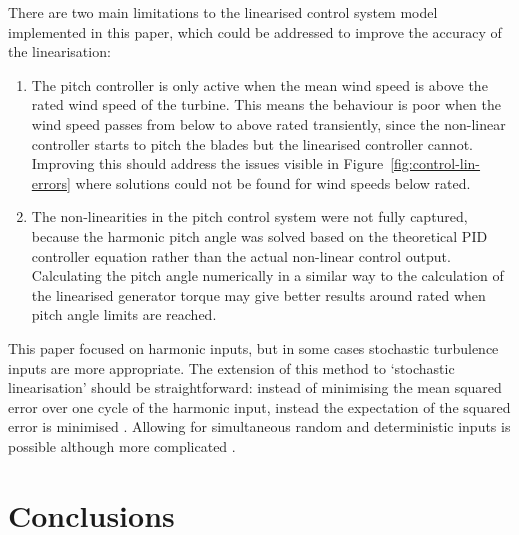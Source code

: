 \documentclass[a4paper,preprint]{elsarticle}
\begin{document}
There are two main limitations to the linearised control system model
implemented in this paper, which could be addressed to improve the accuracy of
the linearisation:
\begin{enumerate}
\item The pitch controller is only active when the mean wind speed is above the
  rated wind speed of the turbine. This means the behaviour is poor when the
  wind speed passes from below to above rated transiently, since the non-linear
  controller starts to pitch the blades but the linearised controller cannot.
  Improving this should address the issues visible in
  Figure~\ref{fig:control-lin-errors} where solutions could not be found for
  wind speeds below rated.
\item The non-linearities in the pitch control system were not fully captured,
  because the harmonic pitch angle was solved based on the theoretical PID
  controller equation rather than the actual non-linear control output.
  Calculating the pitch angle numerically in a similar way to the calculation of
  the linearised generator torque may give better results around rated when
  pitch angle limits are reached.
\end{enumerate}

This paper focused on harmonic inputs, but in some cases stochastic turbulence
inputs are more appropriate. The extension of this method to `stochastic
linearisation' should be straightforward: instead of minimising the mean squared
error over one cycle of the harmonic input, instead the expectation of the
squared error is minimised \citep[see for example][chapter~6]{Roberts1990}.
Allowing for simultaneous random and deterministic inputs is possible although
more complicated \citep[chapter~7]{Roberts1990}.

\section{Conclusions}
\label{sec:control-conclusions}
\end{document}
